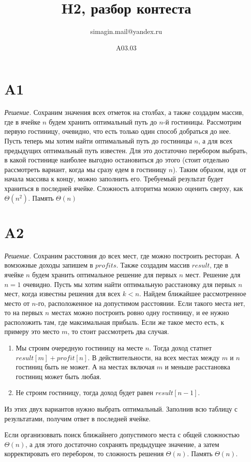 \documentclass[10pt, oneside, notitlepage]{article}
\title{H2, разбор контеста}
\author{simagin.mail@yandex.ru}
\date{A03.03}
\newenvironment{solution}
    {\textit{Решение. }}
    {\par}
\begin{document}
\maketitle


\section*{A1}
\begin{solution}
    Сохраним значения всех отметок на столбах,
    а также создадим массив, где в ячейке $n$ будем хранить оптимальный путь до $n$-й гостиницы.
    Рассмотрим первую гостиницу, очевидно, что есть только один способ добраться до нее.
    Пусть теперь мы хотим найти оптимальный путь до гостиницы $n$,
    а для всех предыдущих оптимальный путь известен.
    Для это достаточно перебором выбрать,
    в какой гостинице наиболее выгодно остановиться до этого
    (стоит отдельно рассмотреть вариант, когда мы сразу едем в гостиницу $n$).
    Таким образом, идя от начала массива к концу, можно заполнить его.
    Требуемый результат будет храниться в последней ячейке.
    Сложность алгоритма можно оценить сверху, как $\Theta(n^2)$. Память $\Theta(n)$
\end{solution}

\section*{A2}
\begin{solution}
    Сохраним расстояния до всех мест, где можно построить ресторан.
    А вомзожные доходы запишем в $profits$.
    Также создадим массив $result$, где в ячейке $n$
    будем хранить оптимальное решение для первых $n$ мест.
    Решение для $n = 1$ очевидно.
    Пусть мы хотим найти оптимальную расстановку для первых $n$ мест,
    когда известны решения для всех $k < n$.
    Найдем ближайшее рассмотренное место от $n$-го, расположенное на допустимом расстоянии.
    Если такого места нет, то на первых $n$ местах можно построить ровно одну
    гостиницу, и ее нужно расположить там, где максимальная прибыль.
    Если же такое место есть, к примеру это место $m$, то стоит рассмотреть два случая.
    \begin{enumerate}
        \item Мы строим очередную гостиницу на месте $n$.
        Тогда доход статнет $result[m] + profit[n]$. В действительности, на всех местах
        между $m$ и $n$ гостиниц быть не может. А на местах включая $m$ и меньше
        расстановка гостиниц может быть любая.
        \item Не строим гостиницу, тогда доход будет равен $result[n-1]$.
    \end{enumerate}
    Из этих двух вариантов нужно выбрать оптимальный.
    Заполнив всю таблицу с результатами, получим ответ в последней ячейке.

    Если организоввать поиск ближайнего допустимого места с общей сложностью $\Theta(n)$,
    а для этого достаточно сохранять предыдущее значение, а затем корректировать его перебором,
    то сложность решения $\Theta(n)$. Память $\Theta(n)$.
\end{solution}
\end{document}
